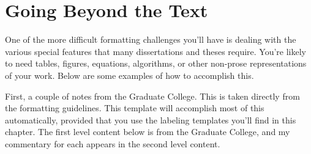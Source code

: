 \chapter[: A Sample Document]{Going Beyond the Text}

One of the more difficult formatting challenges you'll have is dealing with the various special features that many dissertations and theses require. You're likely to need tables, figures, equations, algorithms, or other non-prose representations of your work. Below are some examples of how to accomplish this.

First, a couple of notes from the Graduate College. This is taken directly from the formatting guidelines. This template will accomplish most of this automatically, provided that you use the labeling templates you'll find in this chapter. The first level content below is from the Graduate College, and my commentary for each appears in the second level content.

